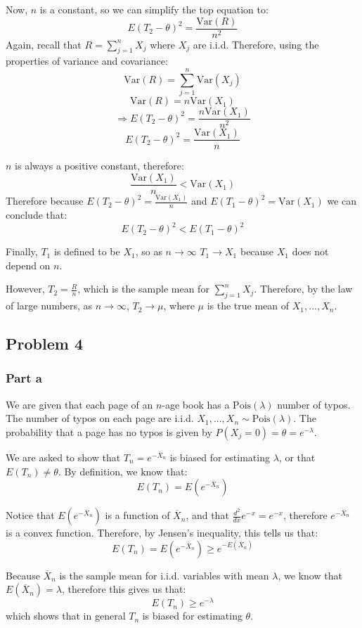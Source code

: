 \documentclass{article}
\begin{document}
Now, $n$ is a constant, so we can simplify the top equation to:
$$E(T_{2} - \theta)^{2} = \frac{\text{Var}(R)}{n^{2}}$$
Again, recall that $R = \sum_{j = 1}^{n} X_{j}$ where $X_{j}$ are i.i.d. Therefore, using the properties of variance and covariance:
$$\text{Var}(R) = \sum_{j = 1}^{n} \text{Var}(X_{j})$$
$$\text{Var}(R) = n \text{Var}(X_{1})$$
$$\Rightarrow E(T_{2} - \theta)^{2} = \frac{n\text{Var}(X_{1})}{n^{2}}$$
$$E(T_{2} - \theta)^{2} = \frac{\text{Var}(X_{1})}{n}$$

$n$ is always a positive constant, therefore:
$$\frac{\text{Var}(X_{1})}{n} < \text{Var}(X_{1})$$
Therefore because $E(T_{2} - \theta)^{2} = \frac{\text{Var}(X_{1})}{n}$ and $E(T_{1} - \theta)^{2} = \text{Var}(X_{1})$ we can conclude that:
$$E(T_{2} - \theta)^{2} < E(T_{1} - \theta)^{2}$$

Finally, $T_{1}$ is defined to be $X_{1}$, so as $n \rightarrow \infty$ $T_{1} \rightarrow X_{1}$ because $X_{1}$ does not depend on $n$. 

However, $T_{2} = \frac{R}{n}$, which is the sample mean for $\sum_{j = 1}^{n} X_{j}$. Therefore, by the law of large numbers,  as $n \rightarrow \infty$, $T_{2} \rightarrow \mu$, where $\mu$ is the true mean of $X_{1}, ..., X_{n}$.

\subsection{Problem 4}
\subsubsection{Part a}
We are given that each page of an $n$-age book has a $\text{Pois}(\lambda)$ number of typos. The number of typos on each page are i.i.d. $X_{1}, ... , X_{n} \sim \text{Pois}(\lambda)$. The probability that a page has no typos is given by $P(X_{j} = 0) = \theta = e^{-\lambda}$.

We are asked to show that $T_{n} = e^{-\overline{X}_{n}}$ is biased for estimating $\lambda$, or that $E(T_{n}) \neq \theta$. By definition, we know that:
$$E(T_{n}) = E(e^{-\overline{X}_{n}})$$

Notice that $E(e^{-\overline{X}_{n}})$ is a function of $\overline{X}_{n}$, and that $\frac{d^{2}}{dx}e^{-x} = e^{-x}$, therefore $e^{-\overline{X}_{n}}$ is a convex function. Therefore, by Jensen's inequality, this tells us that:
$$E(T_{n}) = E(e^{-\overline{X}_{n}}) \geq e^{-E(\overline{X}_{n})}$$

Because $\overline{X}_{n}$ is the sample mean for i.i.d. variables with mean $\lambda$, we know that $E(\overline{X}_{n}) = \lambda$, therefore this gives us that:
$$E(T_{n})  \geq e^{-\lambda}$$
which shows that in general $T_{n}$ is biased for estimating $\theta$.
\end{document}
